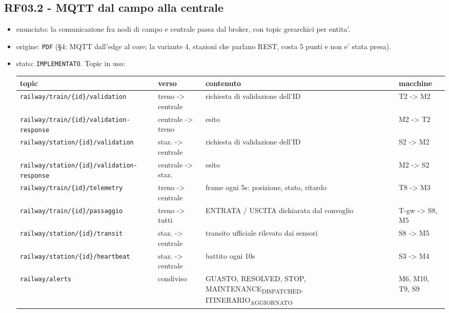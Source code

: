 \documentclass[11pt]{article}
\begin{document}
\subsection{RF03.2 - MQTT dal campo alla centrale}
\label{sec:org1627963}
\begin{itemize}
\item enunciato: la comunicazione fra nodi di campo e centrale passa dal broker, con topic gerarchici
per entita'.
\item origine: \texttt{PDF} (§4: MQTT dall'edge al core; la variante 4, stazioni che parlano REST, costa 5
punti e non e' stata presa).
\item stato: \texttt{IMPLEMENTATO}. Topic in uso:
\begin{center}
\begin{tabular}{llll}
topic & verso & contenuto & macchine\\
\hline
\texttt{railway/train/\{id\}/validation} & treno -> centrale & richiesta di validazione dell'ID & T2 -> M2\\
\texttt{railway/train/\{id\}/validation-response} & centrale -> treno & esito & M2 -> T2\\
\texttt{railway/station/\{id\}/validation} & staz. -> centrale & richiesta di validazione dell'ID & S2 -> M2\\
\texttt{railway/station/\{id\}/validation-response} & centrale -> staz. & esito & M2 -> S2\\
\texttt{railway/train/\{id\}/telemetry} & treno -> centrale & frame ogni 5s: posizione, stato, ritardo & T8 -> M3\\
\texttt{railway/train/\{id\}/passaggio} & treno -> tutti & ENTRATA / USCITA dichiarata dal convoglio & T-gw -> S8, M5\\
\texttt{railway/station/\{id\}/transit} & staz. -> centrale & transito ufficiale rilevato dai sensori & S8 -> M5\\
\texttt{railway/station/\{id\}/heartbeat} & staz. -> centrale & battito ogni 10s & S3 -> M4\\
\texttt{railway/alerts} & condiviso & GUASTO, RESOLVED, STOP, MAINTENANCE\textsubscript{DISPATCHED}, ITINERARIO\textsubscript{AGGIORNATO} & M6, M10, T9, S9\\
\end{tabular}
\end{center}
\end{itemize}
\end{document}
